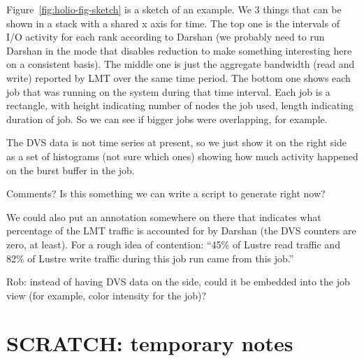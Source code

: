 \documentclass[conference,10pt,compsocconf]{IEEEtran}
\begin{document}
Figure~\ref{fig:holio-fig-sketch} is a sketch of an example.  We 3 things
that can be shown in a stack with a shared x axis for time.  The top one is
the intervals of I/O activity for each rank according to Darshan (we probably
need to run Darshan in the mode that disables reduction to make something
interesting here on a consistent basis).  The middle one is just the
aggregate bandwidth (read and write) reported by LMT over the same time
period.  The bottom one shows each job that was running on the system during
that time interval.  Each job is a rectangle, with height indicating number
of nodes the job used, length indicating duration of job.  So we can see if
bigger jobs were overlapping, for example.

The DVS data is not time series at present, so we just show it on the right
side as a set of histograms (not sure which ones) showing how much activity
happened on the burst buffer in the job.

Comments?  Is this something we can write a script to generate right now?

We could also put an annotation somewhere on there that indicates what
percentage of the LMT traffic is accounted for by Darshan (the DVS counters
are zero, at least).  For a rough idea of contention: ``45\% of Lustre read
traffic and 82\% of Lustre write traffic during this job run came from this
job.''

Rob: instead of having DVS data on the side, could it be embedded into the
job view (for example, color intensity for the job)?

\section{SCRATCH: temporary notes}
\end{document}
